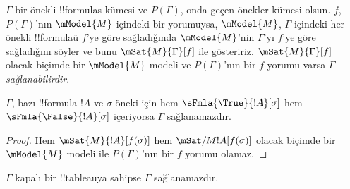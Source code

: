\documentclass[../../../include/open-logic-section]{subfiles}
\begin{document}
\begin{defn}
  $\Gamma$ bir önekli !!{formula}s kümesi ve $P(\Gamma)$, onda geçen önekler
  kümesi olsun. $f$, $P(\Gamma)$'nın $\mModel{M}$ içindeki bir yorumuysa,
  $\mModel{M}$, $\Gamma$ içindeki her önekli !!{formula}{}ü $f$'ye göre
  sağladığında $\mModel{M}$'nin $\Gamma$'yı $f$'ye göre sağladığını söyler ve bunu
  $\mSat{M}{\Gamma}[f]$ ile gösteririz. $\mSat{M}{\Gamma}[f]$ olacak biçimde
  bir $\mModel{M}$ modeli ve $P(\Gamma)$'nın bir $f$ yorumu varsa $\Gamma$
  \emph{sağlanabilirdir}.
\end{defn}

\begin{prop}
  $\Gamma$, bazı !!{formula} $!A$ ve $\sigma$ öneki için hem
  $\sFmla{\True}{!A}[\sigma]$ hem $\sFmla{\False}{!A}[\sigma]$ içeriyorsa
  $\Gamma$ sağlanamazdır.
\end{prop}

\begin{proof}
  Hem $\mSat{M}{!A}[f(\sigma)]$ hem $\mSat/{M}{!A}[f(\sigma)]$ olacak
  biçimde bir $\mModel{M}$ modeli ile $P(\Gamma)$'nın bir $f$ yorumu olamaz.
\end{proof}

\begin{thm}[Sağlamlık]
  $\Gamma$ kapalı bir !!{tableau}{}ya sahipse $\Gamma$ sağlanamazdır.
\end{thm}
\end{document}

